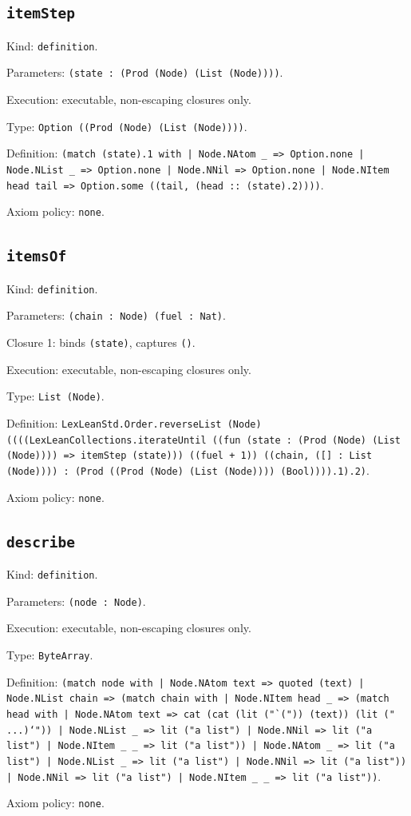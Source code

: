 \documentclass[11pt]{article}
\begin{document}
\subsection*{\texttt{itemStep}}
\noindent Kind: \texttt{definition}.\par
\noindent Parameters: \texttt{(state : (Prod (Node) (List (Node))))}.\par
\noindent Execution: executable, non-escaping closures only.\par
\noindent Type: \texttt{Option ((Prod (Node) (List (Node))))}.\par
\noindent Definition: \texttt{(match (state).1 with | Node.NAtom \_ => Option.none | Node.NList \_ => Option.none | Node.NNil => Option.none | Node.NItem head tail => Option.some ((tail, (head :: (state).2))))}.\par
\noindent Axiom policy: \texttt{none}.\par
\subsection*{\texttt{itemsOf}}
\noindent Kind: \texttt{definition}.\par
\noindent Parameters: \texttt{(chain : Node) (fuel : Nat)}.\par
\noindent Closure 1: binds \texttt{(state)}, captures \texttt{()}.\par
\noindent Execution: executable, non-escaping closures only.\par
\noindent Type: \texttt{List (Node)}.\par
\noindent Definition: \texttt{LexLeanStd.Order.reverseList (Node) ((((LexLeanCollections.iterateUntil ((fun (state : (Prod (Node) (List (Node)))) => itemStep (state))) ((fuel + 1)) ((chain, ([] : List (Node)))) : (Prod ((Prod (Node) (List (Node)))) (Bool)))).1).2)}.\par
\noindent Axiom policy: \texttt{none}.\par
\subsection*{\texttt{describe}}
\noindent Kind: \texttt{definition}.\par
\noindent Parameters: \texttt{(node : Node)}.\par
\noindent Execution: executable, non-escaping closures only.\par
\noindent Type: \texttt{ByteArray}.\par
\noindent Definition: \texttt{(match node with | Node.NAtom text => quoted (text) | Node.NList chain => (match chain with | Node.NItem head \_ => (match head with | Node.NAtom text => cat (cat (lit ("`(")) (text)) (lit (" ...)`")) | Node.NList \_ => lit ("a list") | Node.NNil => lit ("a list") | Node.NItem \_ \_ => lit ("a list")) | Node.NAtom \_ => lit ("a list") | Node.NList \_ => lit ("a list") | Node.NNil => lit ("a list")) | Node.NNil => lit ("a list") | Node.NItem \_ \_ => lit ("a list"))}.\par
\noindent Axiom policy: \texttt{none}.\par
\end{document}
